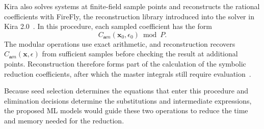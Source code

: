Kira also solves systems at finite-field sample points and reconstructs the
rational coefficients with FireFly, the reconstruction library introduced
into the solver in Kira 2.0~\cite{Kira2}. In this procedure, each sampled
coefficient has the form
\begin{equation}
 C_{\boldsymbol a m}(\boldsymbol x_0,\epsilon_0)\bmod P.
 \label{eq:sampled-coefficient}
\end{equation}
The modular operations use exact arithmetic, and reconstruction recovers
$C_{\boldsymbol a m}(\boldsymbol x,\epsilon)$ from sufficient samples
before checking the result at additional points. Reconstruction therefore
forms part of the calculation of the symbolic reduction coefficients,
after which the master integrals still require evaluation~\cite{Kira2}.

Because seed selection determines the equations that enter this procedure
and elimination decisions determine the substitutions and intermediate
expressions, the proposed ML models would guide these two operations to
reduce the time and memory needed for the reduction.
